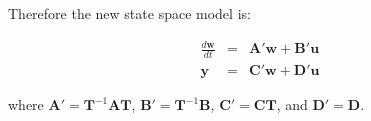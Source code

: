 Therefore the new state space model is:
 
\begin{eqnarray*}
	\frac{d\mathbf{w}}{dt} & = & \mathbf{A}'\mathbf{w} + \mathbf{B}'\mathbf{u} \\
	\mathbf{y} & = & \mathbf{C}'\mathbf{w}+\mathbf{D}'\mathbf{u}
\end{eqnarray*}

where $\mathbf{A}'=\mathbf{T}^{-1}\mathbf{A}\mathbf{T}$, $\mathbf{B}'=\mathbf{T}^{-1}\mathbf{B}$, $\mathbf{C}'=\mathbf{CT}$, and $\mathbf{D}'=\mathbf{D}$.
 






\endinput

